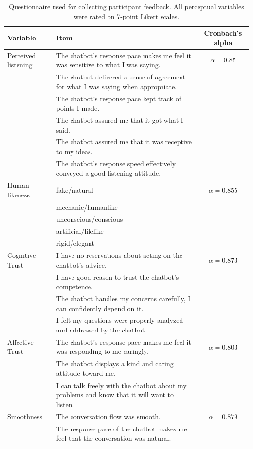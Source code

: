 \begin{table}[t!]
    \centering
    \footnotesize
    \caption{Questionnaire used for collecting participant feedback. All perceptual variables were rated on 7-point Likert scales.} 
    \label{tab:items}
    \begin{tabular}{llc}
    \toprule
         \textbf{Variable}&  \textbf{Item}& \textbf{Cronbach's alpha}\\\midrule
         Perceived listening&  The chatbot's response pace makes me feel it was sensitive to what I was saying.& $\alpha=0.85$\\
         &  The chatbot delivered a sense of agreement for what I was saying when appropriate.& \\
         &  The chatbot's response pace kept track of points I made.& \\
 & The chatbot assured me that it got what I said. &\\
         &  The chatbot assured me that it was receptive to my ideas. & \\
         &  The chatbot's response speed effectively conveyed a good listening attitude. & \\ 
 Human-likeness& fake/natural&$\alpha=0.855$\\
 & mechanic/humanlike&\\
 & unconscious/conscious&\\
 & artificial/lifelike&\\
 & rigid/elegant&\\ 
 Cognitive Trust& I have no reservations about acting on the chatbot's advice.& $\alpha=0.873$\\
 & I have good reason to trust the chatbot's competence. &\\
 & The chatbot handles my concerns carefully, I can confidently depend on it.&\\
 & I felt my questions were properly analyzed and addressed by the chatbot. &\\
 Affective Trust& The chatbot's response pace makes me feel it was responding to me caringly.  &$\alpha=0.803$\\
 & The chatbot displays a kind and caring attitude toward me. &\\
 & I can talk freely with the chatbot about my problems and know that it will want to listen.&\\
 Smoothness& The conversation flow was smooth. 
&$\alpha=0.879$\\
 & The response pace of the chatbot makes me feel that the conversation was natural.&\\

\end{tabular}
\end{table}
